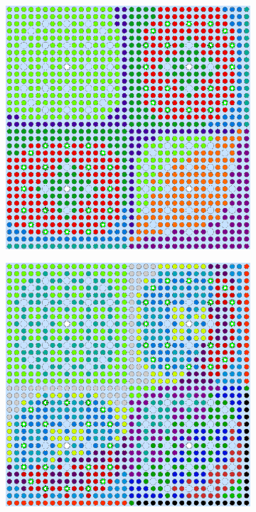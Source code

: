 \begin{appendices}
\begin{figure}[h!]
\begin{subfigure}{0.48\textwidth}
  \centering
  \includegraphics[width=0.85\linewidth]{figures/unsupervised/geometries/without-features/4-clusters/combined/reflector}
  \caption{}
  \label{fig:no-features-reflector-combined-4}
\end{subfigure}
\begin{subfigure}{0.48\textwidth}
  \centering
  \includegraphics[width=0.85\linewidth]{figures/unsupervised/geometries/without-features/8-clusters/pinch/reflector}

\end{subfigure}
\end{figure}
\end{appendices}
